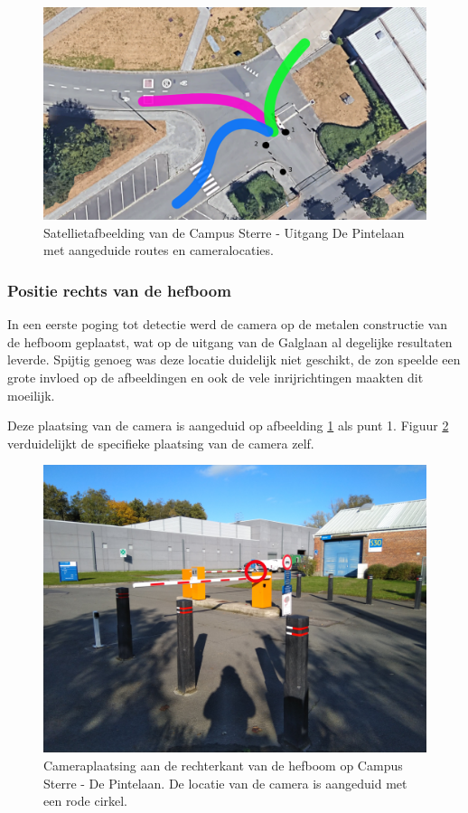 \begin{figure}[h!]
	\centering
	\includegraphics[width=\linewidth]{img/satellietdepintelaan.png}
	\caption{Satellietafbeelding van de Campus Sterre - Uitgang De Pintelaan met aangeduide routes en cameralocaties. \autocite{ugent2019google}}
	\label{fig:satellietdepintelaan}
\end{figure}

\subsubsection{Positie rechts van de hefboom}
In een eerste poging tot detectie werd de camera op de metalen constructie van de hefboom geplaatst, wat op de uitgang van de Galglaan al degelijke resultaten leverde. Spijtig genoeg was deze locatie duidelijk niet geschikt, de zon speelde een grote invloed op de afbeeldingen en ook de vele inrijrichtingen maakten dit moeilijk.

Deze plaatsing van de camera is aangeduid op afbeelding \ref{fig:satellietdepintelaan} als punt 1. Figuur \ref{fig:plaatsingdepintelaanorigineel} verduidelijkt de specifieke plaatsing van de camera zelf.

\begin{figure}[h!]
	\centering
	\includegraphics[width=0.8\linewidth]{img/depintelaanorigineel.jpg}
	\caption{Cameraplaatsing aan de rechterkant van de hefboom op Campus Sterre - De Pintelaan. De locatie van de camera is aangeduid met een rode cirkel.}
	\label{fig:plaatsingdepintelaanorigineel}
\end{figure}

